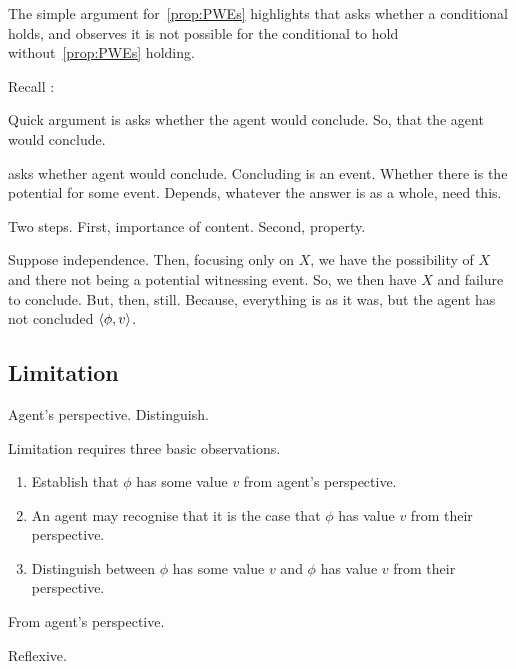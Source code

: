 \begin{note}
  The simple argument for~\autoref{prop:PWEs} highlights that \qzS{} asks whether a conditional holds, and observes it is not possible for the conditional to hold without~\autoref{prop:PWEs} holding.
\end{note}

\begin{note}
  Recall \qzS{}:
  \begin{quote}
    \questionZS*
  \end{quote}
\end{note}

\begin{note}
  Quick argument is \qzS{} asks whether the agent would conclude.
  So, that the agent would conclude.
\end{note}

\begin{note}
  \qzS{} asks whether agent would conclude.
  Concluding is an event.
  Whether there is the potential for some event.
  Depends, whatever the answer is as a whole, need this.

  \begin{argument}
    Two steps.
    First, importance of content.
    Second, property.

    Suppose independence.
    Then, focusing only on \(X\), we have the possibility of \(X\) and there not being a potential witnessing event.
    So, we then have \(X\) and failure to conclude.
    But, then, \requ{} still.
    Because, everything is as it was, but the agent has not concluded \(\langle \phi, v \rangle\).
  \end{argument}

\end{note}

\subsection{Limitation}
\label{sec:limitation}

\begin{note}
  Agent's perspective.
  Distinguish.
\end{note}

\begin{note}
  Limitation requires three basic observations.

  \begin{enumerate}
  \item
    Establish that \(\phi\) has some value \(v\) from agent's perspective.
  \item
    An agent may recognise that it is the case that \(\phi\) has value \(v\) from their perspective.
  \item
    Distinguish between \(\phi\) has some value \(v\) and \(\phi\) has value \(v\) from their perspective.
  \end{enumerate}

  From agent's perspective.

  Reflexive.
  ~\cite{Perry:1979vc}
\end{note}

